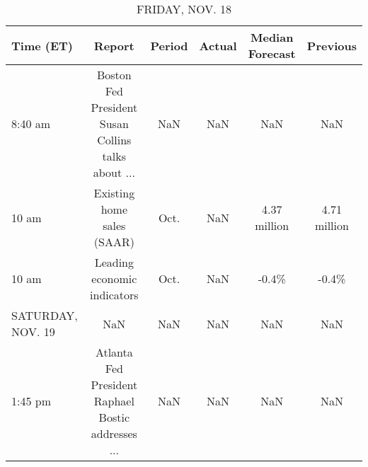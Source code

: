 \documentclass{article}%
\begin{document}
\begin{table}[htbp]%
\caption{FRIDAY, NOV. 18}%
\centering%
\begin{adjustbox}{width=1\textwidth}%
\begin{tabular}{lccccc}
\toprule
        Time (ET) &                                             Report & Period & Actual & Median Forecast &     Previous \\
\midrule
          8:40 am & Boston Fed President Susan Collins talks about ... &    NaN &    NaN &             NaN &          NaN \\
            10 am &                         Existing home sales (SAAR) &   Oct. &    NaN &    4.37 million & 4.71 million \\
            10 am &                        Leading economic indicators &   Oct. &    NaN &           -0.4\% &        -0.4\% \\
SATURDAY, NOV. 19 &                                                NaN &    NaN &    NaN &             NaN &          NaN \\
          1:45 pm & Atlanta Fed President Raphael Bostic addresses ... &    NaN &    NaN &             NaN &          NaN \\
\bottomrule
\end{tabular}
%
\end{adjustbox}%
\end{table}
\end{document}

